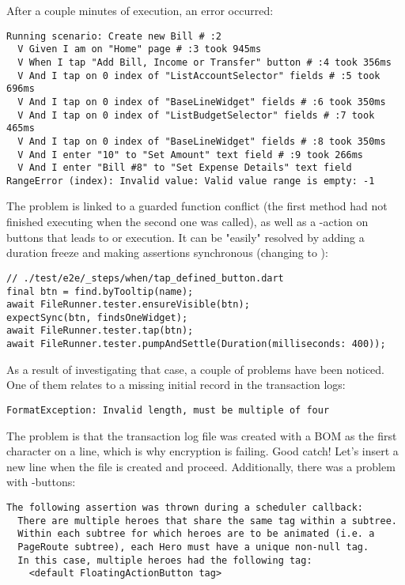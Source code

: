 \noindent After a couple minutes of execution, an error occurred:

\begin{lstlisting}[language=terminal]
Running scenario: Create new Bill # :2
  V Given I am on "Home" page # :3 took 945ms
  V When I tap "Add Bill, Income or Transfer" button # :4 took 356ms
  V And I tap on 0 index of "ListAccountSelector" fields # :5 took 696ms
  V And I tap on 0 index of "BaseLineWidget" fields # :6 took 350ms
  V And I tap on 0 index of "ListBudgetSelector" fields # :7 took 465ms
  V And I tap on 0 index of "BaseLineWidget" fields # :8 took 350ms
  V And I enter "10" to "Set Amount" text field # :9 took 266ms
  V And I enter "Bill #8" to "Set Expense Details" text field
RangeError (index): Invalid value: Valid value range is empty: -1
\end{lstlisting}

\noindent The problem is linked to a guarded function conflict (the first method had not finished executing when the 
second one was called), as well as a -action on buttons that leads to  or  
execution. It can be "easily" resolved by adding a duration freeze and making assertions synchronous (changing 
 to ):

\begin{lstlisting}
// ./test/e2e/_steps/when/tap_defined_button.dart
final btn = find.byTooltip(name);
await FileRunner.tester.ensureVisible(btn);
expectSync(btn, findsOneWidget);
await FileRunner.tester.tap(btn);
await FileRunner.tester.pumpAndSettle(Duration(milliseconds: 400));
\end{lstlisting}

\noindent As a result of investigating that case, a couple of problems have been noticed. One of them relates to a 
missing initial record in the transaction logs:

\begin{lstlisting}[language=terminal]
FormatException: Invalid length, must be multiple of four
\end{lstlisting}

\noindent The problem is that the transaction log file was created with a BOM as the first character on a line, which is 
why encryption is failing. Good catch! Let's insert a new line when the file is created and proceed. Additionally, there 
was a problem with -buttons:

\begin{lstlisting}[language=terminal]
The following assertion was thrown during a scheduler callback:
  There are multiple heroes that share the same tag within a subtree.
  Within each subtree for which heroes are to be animated (i.e. a 
  PageRoute subtree), each Hero must have a unique non-null tag.
  In this case, multiple heroes had the following tag: 
    <default FloatingActionButton tag>
\end{lstlisting}

